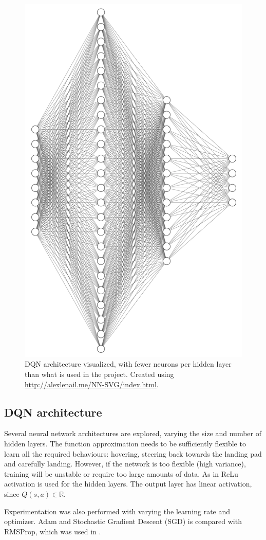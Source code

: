 \documentclass{article}
\begin{document}
\begin{figure}
  \centering
  \includegraphics[width=.6\linewidth]{images/architecture.png}
  \caption{DQN architecture visualized, with fewer neurons per hidden layer than what is used in the project. Created using \url{http://alexlenail.me/NN-SVG/index.html}.}
  \label{fig:archi}
\end{figure}

\subsection{DQN architecture}
Several neural network architectures are explored, varying the size and number of hidden layers. The function approximation needs to be sufficiently flexible to learn all the required behaviours: hovering, steering back towards the landing pad and carefully landing. However, if the network is too flexible (high variance), training will be unstable or require too large amounts of data. As in \cite{mnih2015humanlevel} ReLu activation is used for the hidden layers. The output layer has linear activation, since $Q(s,a) \in \mathbb{R}$.

Experimentation was also performed with varying the learning rate and optimizer. Adam and Stochastic Gradient Descent (SGD) is compared with RMSProp, which was used in \cite{mnih2015humanlevel}.
\end{document}
